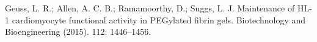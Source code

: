 
\begin{cvparagraph}
Geuss, L. R.; Allen, A. C. B.; Ramamoorthy, D.; Suggs, L. J. Maintenance of HL-1 cardiomyocyte functional activity in PEGylated fibrin gels. Biotechnology and Bioengineering (2015). 112: 1446–1456.
\end{cvparagraph}
